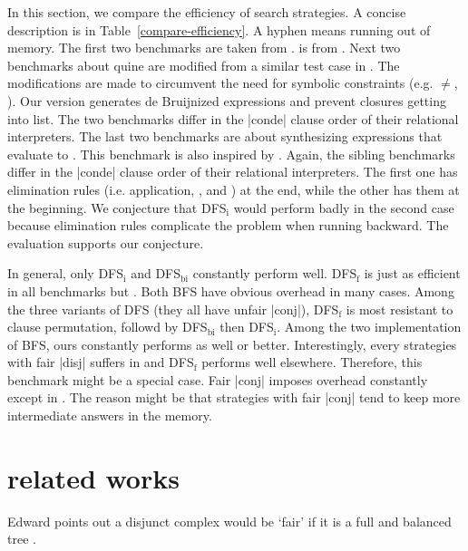 \documentclass[format=acmlarge, review=true, authordraft=true]{acmart}
\begin{document}
In this section, we compare the efficiency of search strategies. A concise 
description is in Table~\ref{compare-efficiency}. A hyphen means running out of 
memory. The first two benchmarks are taken from 
\citet{friedman_reasoned_2018}.  is from 
\citet{rozplokhas2018improving}. Next two benchmarks 
about quine are modified from a similar test case in \citet{byrd2017unified}. 
The modifications are made 
to circumvent the need for symbolic constraints (e.g. $\neq$, 
). Our version generates de 
Bruijnized expressions and prevent closures getting into list. The two 
benchmarks differ in the \scheme|conde| clause order of their relational interpreters. 
The last two 
benchmarks are about synthesizing expressions that evaluate to . This benchmark is also inspired by \citet{byrd2017unified}. Again, the 
sibling benchmarks differ in the \scheme|conde| clause order of their relational 
interpreters. The first one 
has elimination rules (i.e. application, , and ) at the 
end, while the other has them at the beginning. We conjecture that DFS$_\textrm{i}$ would 
perform badly in the second case because elimination rules complicate the 
problem when running backward. The evaluation supports our conjecture.

In general, only DFS$_\textrm{i}$ and DFS$_\textrm{bi}$ constantly perform well. DFS$_\textrm{f}$ is just as 
efficient in all benchmarks but . Both BFS have obvious 
overhead in many cases. Among the three variants of DFS (they all have unfair 
\scheme|conj|), DFS$_\textrm{f}$ is most resistant to clause permutation, followd by DFS$_\textrm{bi}$ then 
DFS$_\textrm{i}$. Among the two implementation of BFS, ours constantly performs as well or 
better. Interestingly, every strategies with fair \scheme|disj| suffers in 
 and DFS$_\textrm{f}$ performs well elsewhere. 
Therefore, this 
benchmark might be a special case. Fair \scheme|conj| imposes overhead constantly 
except in . The reason might be that strategies with fair 
\scheme|conj| tend to keep more intermediate answers in the memory.

\section{related works}

Edward points out a disjunct complex would be `fair' if it is a full and 
balanced tree \citet{yang2010adventures}.
\end{document}
